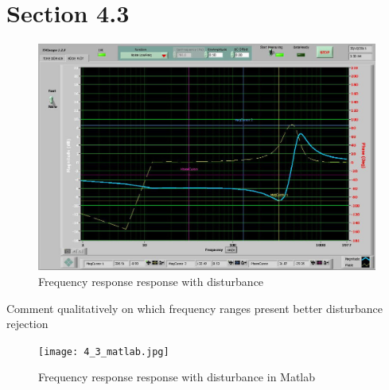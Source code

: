 \documentclass{article}
\begin{document}

\section*{Section 4.3} %
\label{sec:section_4_3}


\begin{figure}[ht]
\centering
\includegraphics[width=7in]{4_3.jpg}
\caption{Frequency response response with disturbance}
\end{figure}
Comment qualitatively on which frequency ranges present better disturbance rejection

\begin{figure}[ht]
\centering
\texttt{[image: 4\_3\_matlab.jpg]}
\caption{Frequency response response with disturbance in Matlab}
\end{figure}

\end{document}
